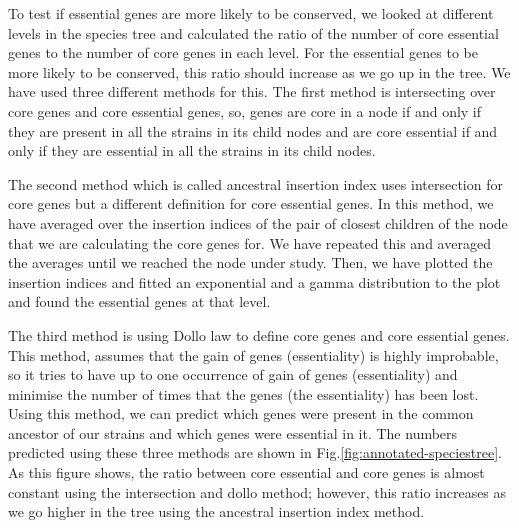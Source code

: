 \documentclass[12pt,letterpaper]{article}
\begin{document}
To test if essential genes are more likely to be conserved, we looked at different levels in the species tree and calculated the ratio of the number of core essential genes to the number of core genes in each level. For the essential genes to be more likely to be conserved, this ratio should increase as we go up in the tree. We have used three different methods for this. The first method is intersecting over core genes and core essential genes, so, genes are core in a node if and only if they are present in all the strains in its child nodes and are core essential if and only if they are essential in all the strains in its child nodes.

The second method which is called ancestral insertion index uses intersection for core genes but a different definition for core essential genes. In this method, we have averaged over the insertion indices of the pair of closest children of the node that we are calculating the core genes for. We have repeated this and averaged the averages until we reached the node under study. Then, we have plotted the insertion indices and fitted an exponential and a gamma distribution to the plot and found the essential genes at that level.

The third method is using Dollo law to define core genes and core essential genes. This method, assumes that the gain of genes (essentiality) is highly improbable, so it tries to have up to one occurrence of gain of genes (essentiality) and minimise the number of times that the genes (the essentiality) has been lost. Using this method, we can predict which genes were present in the common ancestor of our strains and which genes were essential in it. The numbers predicted using these three methods are shown in Fig.\@ \ref{fig:annotated-speciestree}. As this figure shows, the ratio between core essential and core genes is almost constant using the intersection and dollo method; however, this ratio increases as we go higher in the tree using the ancestral insertion index method.
\end{document}
